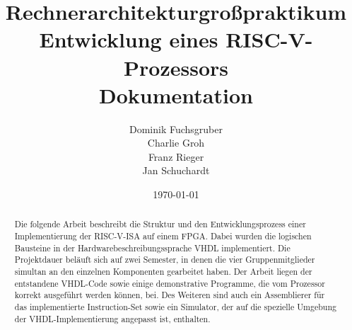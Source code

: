 \documentclass{report}
\title{\large \textbf{Rechnerarchitekturgro\ss{}praktikum} \\[10pt] Entwicklung eines RISC-V-Prozessors \\[10pt] \Huge Dokumentation}
\author{Dominik Fuchsgruber \\ Charlie Groh \\ Franz Rieger \\ Jan Schuchardt}
\date{\today}
\begin{document}
\maketitle
\begin{abstract}
Die folgende Arbeit beschreibt die Struktur und den Entwicklungsprozess einer
Implementierung der RISC-V-ISA auf einem FPGA. Dabei wurden die logischen
Bausteine in der Hardwarebeschreibungssprache VHDL implementiert. Die
Projektdauer bel\"auft sich auf zwei Semester, in denen die vier
Gruppenmitglieder simultan an den einzelnen Komponenten gearbeitet haben. Der
Arbeit liegen der entstandene VHDL-Code sowie einige
demonstrative Programme, die vom Prozessor korrekt ausgef\"uhrt werden
k\"onnen, bei. Des Weiteren sind auch ein Assemblierer f\"ur das implementierte
Instruction-Set sowie ein Simulator, der auf die spezielle Umgebung der
VHDL-Implementierung angepasst ist, enthalten.
\end{abstract}
\begingroup
\let\clearpage\relax
\tableofcontents
\listoftables
\listoffigures
\endgroup
\clearpage{}








\appendix{}

\clearpage{}

\clearpage{}

\clearpage{}
\end{document}

